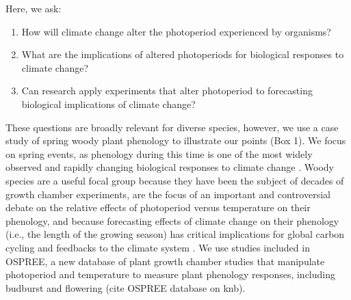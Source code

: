 \documentclass{article}
\begin{document}
\par Here, we ask: 
\begin{enumerate}
\item How will climate change alter the photoperiod experienced by organisms? 
\item What are the implications of altered photoperiods for biological responses to climate change?
\item Can research apply experiments that alter photoperiod to forecasting biological implications of climate change?

\end{enumerate}
\par These questions are broadly relevant for diverse species, however, we use a case study of spring woody plant phenology to illustrate our points (Box 1). We focus on spring events, as phenology during this time is one of the most widely observed and rapidly changing biological responses to climate change \citep{parmesan2006}. Woody species are a useful focal group because they have been the subject of decades of growth chamber experiments, are the focus of an important and controversial debate on the relative effects of photoperiod versus temperature on their phenology, and because forecasting effects of climate change on their phenology (i.e., the length of the growing season) has critical implications for global carbon cycling and feedbacks to the climate system \citep{richardson2013}. We use studies included in OSPREE, a new database of plant growth chamber studies that manipulate photoperiod and temperature to measure plant phenology responses, including budburst and flowering (cite OSPREE database on knb).%
\end{document}

